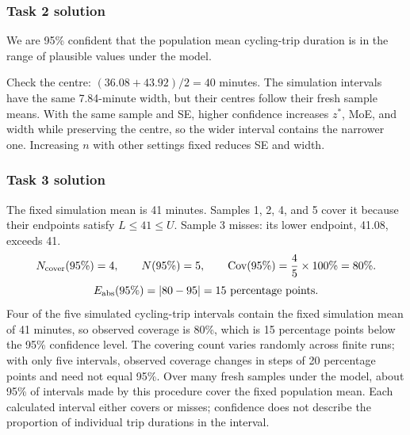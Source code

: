 \subsubsection*{Task 2 solution}
We are 95\% confident that the population mean cycling-trip duration is in the range of plausible values under the model.

Check the centre: $(36.08+43.92)/2=40$ minutes. The simulation intervals have the same 7.84-minute width, but their centres follow their fresh sample means. With the same sample and SE, higher confidence increases $z^*$, MoE, and width while preserving the centre, so the wider interval contains the narrower one. Increasing $n$ with other settings fixed reduces SE and width.

\subsubsection*{Task 3 solution}
The fixed simulation mean is 41 minutes. Samples 1, 2, 4, and 5 cover it because their endpoints satisfy $L\leq41\leq U$. Sample 3 misses: its lower endpoint, 41.08, exceeds 41.
\[
N_{\rm cover}(95\%)=4,\qquad N(95\%)=5,\qquad
\mathrm{Cov}(95\%)=\frac45\times100\%=80\%.
\]
\[
E_{\rm abs}(95\%)=|80-95|=15\text{ percentage points}.
\]
Four of the five simulated cycling-trip intervals contain the fixed simulation mean of 41 minutes, so observed coverage is 80\%, which is 15 percentage points below the 95\% confidence level. The covering count varies randomly across finite runs; with only five intervals, observed coverage changes in steps of 20 percentage points and need not equal 95\%. Over many fresh samples under the model, about 95\% of intervals made by this procedure cover the fixed population mean. Each calculated interval either covers or misses; confidence does not describe the proportion of individual trip durations in the interval.


